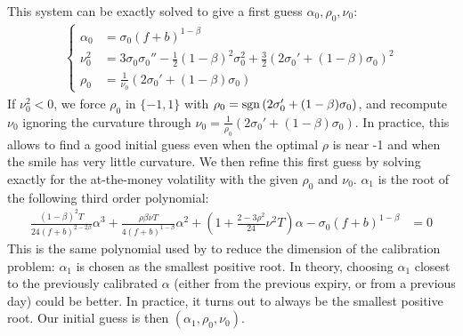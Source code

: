 \documentclass[]{rAMF2e}
\begin{document}
This system can be exactly solved to give a first guess $\alpha_0, \rho_0,\nu_0$:
\begin{align}
  \begin{cases}
\alpha_0 &=  \sigma_0 (f+b)^{1-\beta}\\
\nu_0^2 &= 3\sigma_0\sigma_0''-\frac{1}{2}(1-\beta)^2\sigma_0^2+\frac{3}{2}\left(2\sigma_0'+(1-\beta)\sigma_0\right)^2 \\
\rho_0 &= \frac{1}{\nu_0}\left(2\sigma_0'+(1-\beta)\sigma_0\right) 
\end{cases} 
\end{align}
If $\nu_0^2 < 0$, we force $\rho_0$ in $\lbrace-1,1\rbrace$ with $\rho_0 = \mathop{\mathrm{sgn}}\left(2\sigma_0'+(1-\beta)\sigma_0\right)$, and recompute $\nu_0$ ignoring the curvature through $\nu_0 =\frac{1}{\rho_0}\left(2\sigma_0'+(1-\beta)\sigma_0\right)$. In practice, this allows to find a good initial guess even when the optimal $\rho$ is near -1 and when the smile has very little curvature. We then refine this first guess by solving exactly for the at-the-money volatility with the given $\rho_0$ and $\nu_0$. $\alpha_1$ is the root of the following third order polynomial: 
\begin{align}
\frac{(1-\beta)^2 T}{24 (f+b)^{2-2\beta}}\alpha^3+ \frac{\rho\beta\nu T}{4(f+b)^{1-\beta}}\alpha^2 + \left(1+\frac{2-3\rho^2}{24}\nu^2 T\right)\alpha - \sigma_0 (f+b)^{1-\beta} &= 0
\end{align}
This is the same polynomial used by \citet{west2005calibration} to reduce the dimension of the calibration problem: $\alpha_1$ is chosen as the smallest positive root. In theory, choosing $\alpha_1$ closest to the previously calibrated $\alpha$ (either from the previous expiry, or from a previous day) could be better. In practice, it turns out to always be the smallest positive root. 
Our initial guess is then $(\alpha_1, \rho_0, \nu_0)$.
\end{document}
